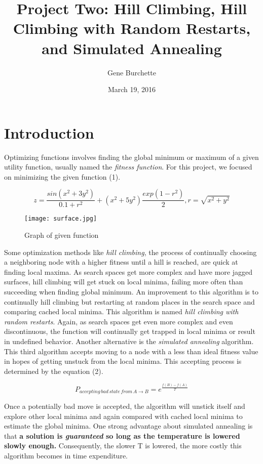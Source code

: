 \documentclass{article}
\title{Project Two: Hill Climbing, Hill Climbing with Random Restarts, and Simulated Annealing}
\author{Gene Burchette}
\date{March 19, 2016}
\begin{document}
\maketitle

\section{Introduction}
    Optimizing functions involves finding the global minimum or maximum of a given utility function, usually named the \textit{fitness function}. For this project, we focused on minimizing the given function (1).
    
    \begin{equation}
        z = \frac{sin(x^2 + 3y^2)}{0.1 + r^2} + (x^2 + 5y^2)\frac{exp(1 - r^2)}{2}, r = \sqrt{x^2 + y^2}
    \end{equation}
    
    
    \begin{figure}[hb!]
        \centering
        \texttt{[image: surface.jpg]}
        \caption{Graph of given function}
        \label{fig:surface}
    \end{figure}

    Some optimization methods like \textit{hill climbing}, the process of continually choosing a neighboring node with a higher fitness until a hill is reached, are quick at finding local maxima. As search spaces get more complex and have more jagged surfaces, hill climbing will get stuck on local minima, failing more often than succeeding when finding global minimum. An improvement to this algorithm is to continually hill climbing but restarting at random places in the search space and comparing cached local minima. This algorithm is named \textit{hill climbing with random restarts}. Again, as search spaces get even more complex and even discontinuous, the function will continually get trapped in local minima or result in undefined behavior. Another alternative is the \textit{simulated annealing} algorithm. This third algorithm accepts moving to a node with a less than ideal fitness value in hopes of getting unstuck from the local minima. This accepting process is determined by the equation (2).
    
    \begin{equation}
        P_{accepting\,bad\,state\,from\,A \to B} = e^\frac{f(B) - f(A)}{T}
    \end{equation}

    Once a potentially bad move is accepted, the algorithm will unstick itself and explore other local minima and again compared with cached local minima to estimate the global minima. One strong advantage about simulated annealing is that \textbf{a solution is \textit{guaranteed} so long as the temperature is lowered slowly enough.} Consequently, the slower T is lowered, the more costly this algorithm becomes in time expenditure.
    
\end{document}
